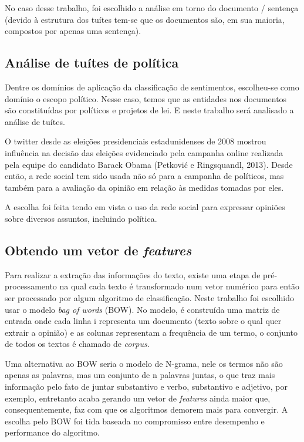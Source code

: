 No caso desse trabalho, foi escolhido a análise em torno do documento / sentença (devido à estrutura
dos tuítes tem-se que os documentos são, em sua maioria, compostos por apenas uma 
sentença). 

\subsection{Análise de tuítes de política}

Dentre os domínios de aplicação da classificação de sentimentos, escolheu-se como domínio o
escopo político. Nesse caso, temos que as entidades nos documentos são constituídas por
políticos e projetos de lei. E neste trabalho será analisado a análise de tuítes.

O twitter desde as eleições presidenciais estadunidenses de 2008 mostrou influência
na decisão das eleições evidenciado pela campanha online realizada pela equipe do
candidato Barack Obama (Petković e Ringsquandl, 2013)\citep{petkovic2013}. Desde então, 
a rede social tem sido usada não só para a campanha de políticos, mas também para a avaliação
da opinião em relação às medidas tomadas por eles.

A escolha foi feita tendo em vista o uso da rede social 
para expressar opiniões sobre diversos assuntos, incluindo política.


\subsection{Obtendo um vetor de \textit{features}}
\label{subsec:featurization}

Para realizar a extração das informações do texto, existe uma etapa de pré-processamento na qual
cada texto é transformado num vetor numérico para então ser processado por algum algoritmo de
classificação. Neste trabalho foi escolhido usar o modelo \textit{bag of words} (BOW). No modelo, 
é construída uma matriz de entrada onde cada linha i representa um documento (texto sobre o qual
quer extrair a opinião) e as colunas representam a frequência de um termo, o conjunto de todos os textos é chamado de \textit{corpus}.

Uma alternativa ao BOW seria o modelo de N-grama, nele os termos não são apenas as palavras, mas
um conjunto de n palavras juntas, o que traz mais informação pelo fato de juntar substantivo e verbo, substantivo e adjetivo, por exemplo, entretanto acaba gerando um vetor de \textit{features}
ainda maior que, consequentemente, faz com que os algoritmos demorem mais para convergir.
A escolha pelo BOW foi tida baseada no compromisso entre desempenho e performance do algoritmo.


